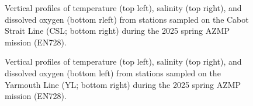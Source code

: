 \documentclass[12pt]{article}\usepackage[]{graphicx}\usepackage[]{color}
\begin{document}
\begin{appendices}
\begin{figure}[htb]
{}

\caption{Vertical profiles of temperature (top left), salinity (top right), and dissolved oxygen (bottom rleft) from stations sampled on the Cabot Strait Line (CSL; bottom right) during the 2025 spring AZMP mission (EN728).}\label{fig:figureA4}
\end{figure}
\clearpage
\begin{figure}[htb]

{\centering {} 

}

\caption{Vertical profiles of temperature (top left), salinity (top right), and dissolved oxygen (bottom left) from stations sampled on the Yarmouth Line (YL; bottom right) during the 2025 spring AZMP mission (EN728).}\label{fig:figureA5}
\end{figure}
\clearpage
\begin{figure}[htb]

{\centering {} 

}
\end{figure}
\end{appendices}
\end{document}
